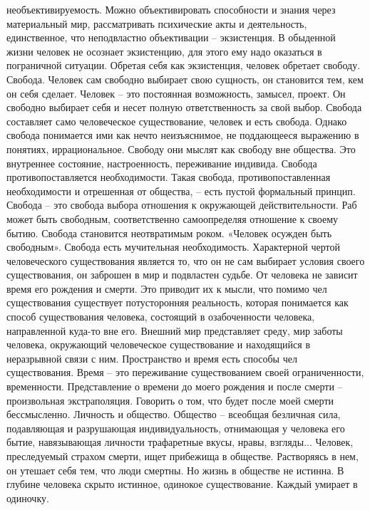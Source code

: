 \documentclass[12pt]{article}
\begin{document}
необъективируемость. Можно объективировать способности и знания через материальный мир, рассматривать
психические акты и деятельность, единственное, что неподвластно объективации – экзистенция. В обыденной
жизни человек не осознает экзистенцию, для этого ему надо оказаться в пограничной ситуации.
Обретая себя как экзистенция, человек обретает свободу.
Свобода. Человек сам свободно выбирает свою сущность, он становится тем, кем он себя сделает. Человек – это
постоянная возможность, замысел, проект. Он свободно выбирает себя и несет полную ответственность за свой
выбор. Свобода составляет само человеческое существование, человек и есть свобода.
Однако  свобода  понимается  ими  как  нечто  неизъяснимое,  не  поддающееся  выражению  в  понятиях,
иррациональное. Свободу они мыслят как свободу вне общества. Это внутреннее состояние, настроенность,
переживание  индивида.  Свобода  противопоставляется  необходимости.  Такая  свобода,  противопоставленная
необходимости и отрешенная от общества, – есть пустой формальный принцип. Свобода – это свобода выбора
отношения  к  окружающей  действительности.  Раб  может  быть  свободным,  соответственно  самоопределяя
отношение к своему бытию. Свобода становится неотвратимым роком. «Человек осужден быть свободным».
Свобода есть мучительная необходимость.
Характерной  чертой  человеческого  существования  является  то,  что  он  не  сам  выбирает  условия  своего
существования, он заброшен в мир и подвластен судьбе. От человека не зависит время его рождения и смерти.
Это  приводит их  к мысли,  что помимо  чел  существования  существует потусторонняя  реальность,  которая
понимается как способ существования человека, состоящий в озабоченности человека, направленной куда-то
вне его. Внешний мир представляет среду, мир заботы человека, окружающий человеческое существование и
находящийся в неразрывной связи с ним. Пространство и время есть способы чел существования. Время – это
переживание  существованием  своей  ограниченности,  временности.  Представление  о  времени  до  моего
рождения  и  после  смерти  –  произвольная  экстраполяция.  Говорить  о  том,  что  будет  после  моей  смерти
бессмысленно.
Личность и общество. Общество – всеобщая безличная сила, подавляющая и разрушающая индивидуальность,
отнимающая у человека его бытие, навязывающая личности трафаретные вкусы, нравы, взгляды... Человек,
преследуемый страхом смерти, ищет прибежища в обществе. Растворяясь в нем, он утешает себя тем, что люди
смертны. Но жизнь в обществе не истинна. В глубине человека скрыто истинное, одинокое существование.
Каждый умирает в одиночку.
\end{document}
